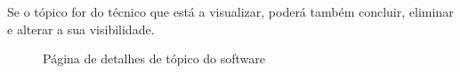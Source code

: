 Se o tópico for do técnico que está a visualizar, poderá também concluir, eliminar e alterar a sua visibilidade.

\begin{figure}[htb]%
  \centering
  \qquad
  \caption{Página de detalhes de tópico do software}%
  \label{fig:27}%
\end{figure}

